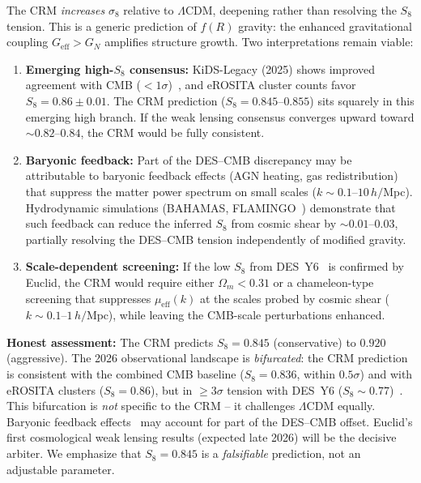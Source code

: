 \documentclass[aps,prd,twocolumn,superscriptaddress,nofootinbib]{revtex4-2}
\begin{document}
The CRM \textit{increases} $\sigma_8$ relative to $\Lambda$CDM, deepening rather than resolving the $S_8$ tension. This is a generic prediction of $f(R)$ gravity: the enhanced gravitational coupling $G_{\mathrm{eff}} > G_N$ amplifies structure growth. Two interpretations remain viable:

\begin{enumerate}
\item \textbf{Emerging high-$S_8$ consensus:} KiDS-Legacy (2025) shows improved agreement with CMB ($< 1\sigma$)~\cite{S8Review2026}, and eROSITA cluster counts favor $S_8 = 0.86 \pm 0.01$. The CRM prediction ($S_8 = 0.845$--$0.855$) sits squarely in this emerging high branch. If the weak lensing consensus converges upward toward $\sim 0.82$--$0.84$, the CRM would be fully consistent.

\item \textbf{Baryonic feedback:} Part of the DES--CMB discrepancy may be attributable to baryonic feedback effects (AGN heating, gas redistribution) that suppress the matter power spectrum on small scales ($k \sim 0.1$--$10\,h/$Mpc). Hydrodynamic simulations (BAHAMAS, FLAMINGO~\cite{FLAMINGO2024}) demonstrate that such feedback can reduce the inferred $S_8$ from cosmic shear by $\sim 0.01$--$0.03$, partially resolving the DES--CMB tension independently of modified gravity.

\item \textbf{Scale-dependent screening:} If the low $S_8$ from DES~Y6~\cite{DESY6} is confirmed by Euclid, the CRM would require either $\Omega_m < 0.31$ or a chameleon-type screening that suppresses $\mu_{\mathrm{eff}}(k)$ at the scales probed by cosmic shear ($k \sim 0.1$--$1 \, h/\mathrm{Mpc}$), while leaving the CMB-scale perturbations enhanced.
\end{enumerate}

\textbf{Honest assessment:} The CRM predicts $S_8 = 0.845$ (conservative) to $0.920$ (aggressive). The 2026 observational landscape is \emph{bifurcated}: the CRM prediction is consistent with the combined CMB baseline ($S_8 = 0.836$, within $0.5\sigma$) and with eROSITA clusters ($S_8 = 0.86$), but in $\geq 3\sigma$ tension with DES~Y6 ($S_8 \sim 0.77$)~\cite{DESY6}. This bifurcation is \emph{not} specific to the CRM -- it challenges $\Lambda$CDM equally. Baryonic feedback effects~\cite{FLAMINGO2024} may account for part of the DES--CMB offset. Euclid's first cosmological weak lensing results (expected late 2026) will be the decisive arbiter. We emphasize that $S_8 = 0.845$ is a \textit{falsifiable} prediction, not an adjustable parameter.
\end{document}
